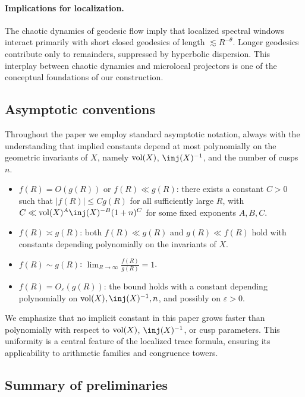 \paragraph{Implications for localization.}
The chaotic dynamics of geodesic flow imply that localized spectral windows 
interact primarily with short closed geodesics of length $\lesssim R^{-\theta}$.  
Longer geodesics contribute only to remainders, suppressed by hyperbolic dispersion.  
This interplay between chaotic dynamics and microlocal projectors is one of the 
conceptual foundations of our construction.

\subsection{Asymptotic conventions}\label{subsec:asymptotics}

Throughout the paper we employ standard asymptotic notation, always with the understanding 
that implied constants depend at most polynomially on the geometric invariants of $X$, 
namely $\operatorname{vol}(X)$, $\inj(X)^{-1}$, and the number of cusps $n$.  

\begin{itemize}
  \item $f(R) = O(g(R))$ or $f(R)\ll g(R)$: there exists a constant $C>0$ such that 
        $|f(R)| \le C g(R)$ for all sufficiently large $R$, with 
        $C \ll \vol(X)^A \inj(X)^{-B} (1+n)^C$ for some fixed exponents $A,B,C$.
  \item $f(R)\asymp g(R)$: both $f(R)\ll g(R)$ and $g(R)\ll f(R)$ hold with constants 
        depending polynomially on the invariants of $X$.
  \item $f(R)\sim g(R)$: $\displaystyle \lim_{R\to\infty}\frac{f(R)}{g(R)}=1$.
  \item $f(R) = O_\varepsilon(g(R))$: the bound holds with a constant depending polynomially 
        on $\vol(X), \inj(X)^{-1}, n$, and possibly on $\varepsilon>0$.
\end{itemize}

We emphasize that no implicit constant in this paper grows faster than polynomially 
with respect to $\operatorname{vol}(X)$, $\inj(X)^{-1}$, or cusp parameters.  
This uniformity is a central feature of the localized trace formula, 
ensuring its applicability to arithmetic families and congruence towers.

\subsection{Summary of preliminaries}\label{subsec:prelim-summary}

